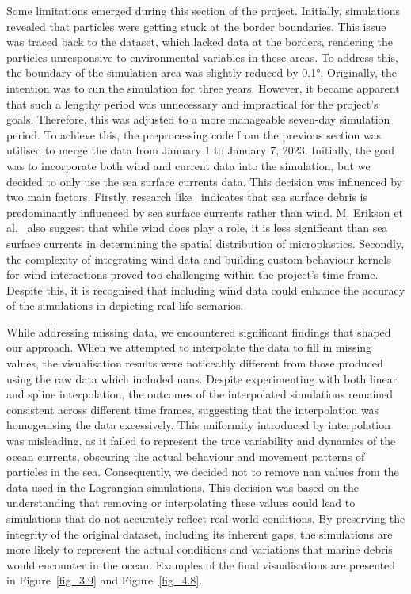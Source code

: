 Some limitations emerged during this section of the project. Initially,  simulations revealed that particles were getting stuck at the border boundaries. This issue was traced back to the dataset, which lacked data at the borders, rendering the particles unresponsive to environmental variables in these areas. To address this, the boundary of the simulation area was slightly reduced by 0.1°. Originally, the intention was to run the simulation for three years. However, it became apparent that such a lengthy period was unnecessary and impractical for the project's goals. Therefore, this was adjusted to a more manageable seven-day simulation period. To achieve this, the preprocessing code from the previous section was utilised to merge the data from January 1 to January 7, 2023. Initially, the goal was to incorporate both wind and current data into the simulation, but we decided to only use the sea surface currents data. This decision was influenced by two main factors. Firstly, research like~\cite{48} indicates that sea surface debris is predominantly influenced by sea surface currents rather than wind. M. Erikson et al.~\cite{48} also suggest that while wind does play a role, it is less significant than sea surface currents in determining the spatial distribution of microplastics. Secondly, the complexity of integrating wind data and building custom behaviour kernels for wind interactions proved too challenging within the project's time frame. Despite this, it is recognised that including wind data could enhance the accuracy of the simulations in depicting real-life scenarios.

While addressing missing data, we encountered significant findings that shaped our approach. When we attempted to interpolate the data to fill in missing values, the visualisation results were noticeably different from those produced using the raw data which included \acrshort{nan}s. Despite experimenting with both linear and spline interpolation, the outcomes of the interpolated simulations remained consistent across different time frames, suggesting that the interpolation was homogenising the data excessively. This uniformity introduced by interpolation was misleading, as it failed to represent the true variability and dynamics of the ocean currents, obscuring the actual behaviour and movement patterns of particles in the sea. Consequently, we decided not to remove \acrshort{nan} values from the data used in the Lagrangian simulations. This decision was based on the understanding that removing or interpolating these values could lead to simulations that do not accurately reflect real-world conditions. By preserving the integrity of the original dataset, including its inherent gaps, the simulations are more likely to represent the actual conditions and variations that marine debris would encounter in the ocean. Examples of the final visualisations are presented in Figure~\ref{fig_3.9} and Figure~\ref{fig_4.8}.

